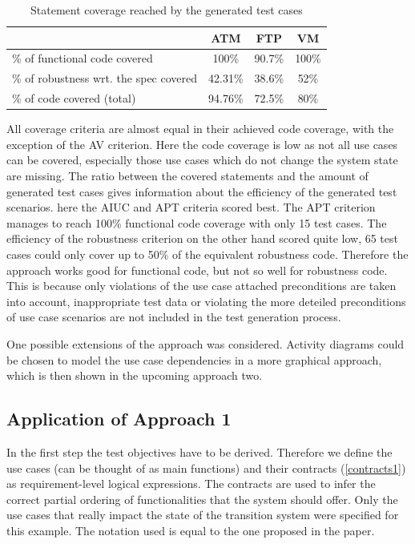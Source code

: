 \begin{table}[h] 
	\centering
	\begin{small}
		\caption{Statement coverage reached by the generated test cases}
		\label{codecoverage}
		\setlength{\tabcolsep}{1em}
		\begin{tabular}{l|c|c|c}
			\hline
			& \textbf{ATM} & \textbf{FTP} & \textbf{VM} \\
			\hline
			\hline	
			\% of functional code covered & 100\% & 90.7\% & 100\% \\
			\hline
			\% of robustness wrt. the spec covered & 42.31\% & 38.6\% & 52\% \\
			\hline
			\% of code covered (total) & 94.76\% & 72.5\% & 80\% \\
			\hline
		\end{tabular}
	\end{small}
\end{table}

All coverage criteria are almost equal in their achieved code coverage, with the exception of the AV criterion. Here the code coverage is low as not all use cases can be covered, especially those use cases which do not change the system state are missing. The ratio between the covered statements and the amount of generated test cases gives information about the efficiency of the generated test scenarios. here the AIUC and APT criteria scored best. The APT criterion manages to reach 100\% functional code coverage with only 15 test cases. The efficiency of the robustness criterion on the other hand scored quite low, 65 test cases could only cover up to 50\% of the equivalent robustness code. Therefore the approach works good for functional code, but not so well for robustness code. This is because only violations of the use case attached preconditions are taken into account, inappropriate test data or violating the more deteiled preconditions of use case scenarios are not included in the test generation process. 

One possible extensions of the approach was considered. Activity diagrams could be chosen to model the use case dependencies in a more graphical approach, which is then shown in the upcoming approach two. 

\subsection{Application of Approach 1}

In the first step the test objectives have to be derived. Therefore we define the use cases (can be thought of as main functions) and their contracts (\autoref{contracts1}) as requirement-level logical expressions. The contracts are used to infer the correct partial ordering of functionalities that the system should offer. Only the use cases that really impact the state of the transition system were specified for this example. The notation used is equal to the one proposed in the paper. 

